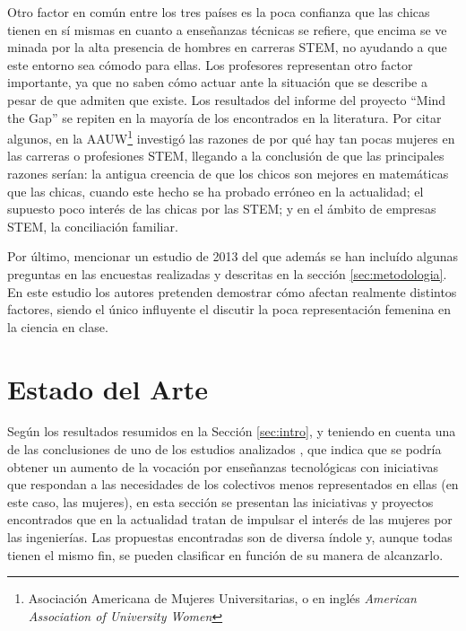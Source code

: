 \documentclass[runningheads,a4paper]{llncs}
\begin{document}
Otro factor en común entre los tres países es la poca confianza que las chicas tienen en sí mismas en cuanto a enseñanzas técnicas se refiere, que encima se ve minada por la alta presencia de hombres en carreras STEM, no ayudando a que este entorno sea cómodo para ellas. Los profesores representan otro factor importante, ya que no saben cómo actuar ante la situación que se describe a pesar de que admiten que existe.
Los resultados del informe del proyecto ``Mind the Gap'' se repiten en la mayoría de los encontrados en la literatura. Por citar algunos, en \cite{hill2010so} la AAUW\footnote{Asociación Americana de Mujeres Universitarias, o en inglés \textit{American Association of University Women}} investigó las razones de por qué hay tan pocas mujeres en las carreras o profesiones STEM, llegando a la conclusión de que las principales razones serían: la antigua creencia de que los chicos son mejores en matemáticas que las chicas, cuando este hecho se ha probado erróneo en la actualidad; el supuesto poco interés de las chicas por las STEM; y en el ámbito de empresas STEM, la conciliación familiar. 

Por último, mencionar un estudio de 2013 \cite{hazari2013factors} del que además se han incluído algunas preguntas en las encuestas realizadas y descritas en la sección \ref{sec:metodologia}. En este estudio los autores pretenden demostrar cómo afectan realmente distintos factores, siendo el único influyente el discutir la poca representación femenina en la ciencia en clase.

\section{Estado del Arte}
\label{sec:EdA}

Según los resultados resumidos en la Sección \ref{sec:intro}, y teniendo en cuenta una de las conclusiones de uno de los estudios analizados \cite{everis2012}, que indica que se podría obtener un aumento de la vocación por enseñanzas tecnológicas con iniciativas que respondan a las necesidades de los colectivos menos representados en ellas (en este caso, las mujeres), en esta sección se presentan las iniciativas y proyectos encontrados que en la actualidad tratan de impulsar el interés de las mujeres por las ingenierías. Las propuestas encontradas son de diversa índole y, aunque todas tienen el mismo fin, se pueden clasificar en función de su manera de alcanzarlo.
\end{document}
